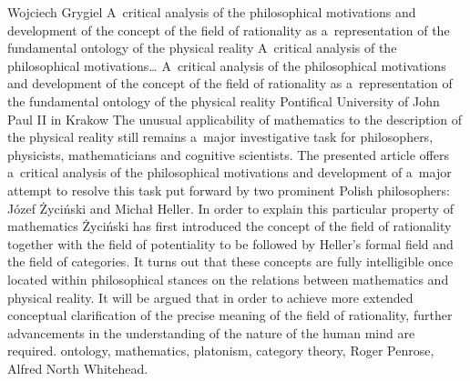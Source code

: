 \begin{artengenv}{Wojciech Grygiel}
	{A~critical analysis of the philosophical motivations and development of the concept of the field of rationality as a~representation of the fundamental ontology of the physical reality}
	{A~critical analysis of the philosophical motivations\ldots}
	{A~critical analysis of the philosophical motivations and development of the concept of the field of rationality as a~representation of the fundamental ontology of the physical reality}
	{Pontifical University of John Paul II in Krakow}
	{The unusual applicability of mathematics to the description of the physical reality still remains a~major investigative task for philosophers, physicists, mathematicians and cognitive scientists. The presented article offers a~critical analysis of the philosophical motivations and development of a~major attempt to resolve this task put forward by two prominent Polish philosophers: Józef Życiński and Michał Heller. In order to explain this particular property of mathematics Życiński has first introduced the concept of the field of rationality together with the field of potentiality to be followed by Heller's formal field and the field of categories. It turns out that these concepts are fully intelligible once located within philosophical stances on the relations between mathematics and physical reality. It will be argued that in order to achieve more extended conceptual clarification of the precise meaning of the field of rationality, further advancements in the understanding of the nature of the human mind are required.}
	{ontology, mathematics, platonism, category theory, Roger Penrose, Alfred North Whitehead.}




\end{artengenv}

